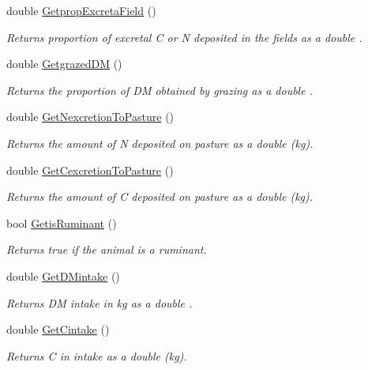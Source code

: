 \begin{DoxyCompactItemize}
double \mbox{\hyperlink{classlivestock_a649ac223461d7deda6829ca476f3b16a}{Getprop\+Excreta\+Field}} ()
\begin{DoxyCompactList}\small\item\em Returns proportion of excretal C or N deposited in the fields as a double . \end{DoxyCompactList}\item 
double \mbox{\hyperlink{classlivestock_a1bd87a98d88bb40dca656880ea0e17e0}{Getgrazed\+DM}} ()
\begin{DoxyCompactList}\small\item\em Returns the proportion of DM obtained by grazing as a double . \end{DoxyCompactList}\item 
double \mbox{\hyperlink{classlivestock_a979d4fdafd3d30bd6047d3d27a1020e5}{Get\+Nexcretion\+To\+Pasture}} ()
\begin{DoxyCompactList}\small\item\em Returns the amount of N deposited on pasture as a double (kg). \end{DoxyCompactList}\item 
double \mbox{\hyperlink{classlivestock_aca22e216df3954148d343e3a552a3497}{Get\+Cexcretion\+To\+Pasture}} ()
\begin{DoxyCompactList}\small\item\em Returns the amount of C deposited on pasture as a double (kg). \end{DoxyCompactList}\item 
bool \mbox{\hyperlink{classlivestock_ab8e1f9dd415c9fca45007fe6b87f02ec}{Getis\+Ruminant}} ()
\begin{DoxyCompactList}\small\item\em Returns true if the animal is a ruminant. \end{DoxyCompactList}\item 
double \mbox{\hyperlink{classlivestock_a4df46ad1b9a5b4bd3d8a70de6f84e17b}{Get\+D\+Mintake}} ()
\begin{DoxyCompactList}\small\item\em Returns DM intake in kg as a double . \end{DoxyCompactList}\item 
double \mbox{\hyperlink{classlivestock_a316a05898f5579f7ed1f5b74655785c2}{Get\+Cintake}} ()
\begin{DoxyCompactList}\small\item\em Returns C in intake as a double (kg). \end{DoxyCompactList}\item 

\end{DoxyCompactItemize}
